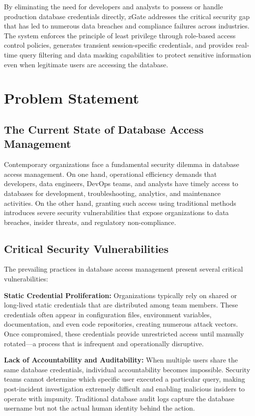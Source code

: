 By eliminating the need for developers and analysts to possess or handle production database credentials directly, zGate addresses the critical security gap that has led to numerous data breaches and compliance failures across industries. The system enforces the principle of least privilege through role-based access control policies, generates transient session-specific credentials, and provides real-time query filtering and data masking capabilities to protect sensitive information even when legitimate users are accessing the database.

\section{Problem Statement}

\subsection{The Current State of Database Access Management}
Contemporary organizations face a fundamental security dilemma in database access management. On one hand, operational efficiency demands that developers, data engineers, DevOps teams, and analysts have timely access to databases for development, troubleshooting, analytics, and maintenance activities. On the other hand, granting such access using traditional methods introduces severe security vulnerabilities that expose organizations to data breaches, insider threats, and regulatory non-compliance.

\subsection{Critical Security Vulnerabilities}
The prevailing practices in database access management present several critical vulnerabilities:

\textbf{Static Credential Proliferation:} Organizations typically rely on shared or long-lived static credentials that are distributed among team members. These credentials often appear in configuration files, environment variables, documentation, and even code repositories, creating numerous attack vectors. Once compromised, these credentials provide unrestricted access until manually rotated—a process that is infrequent and operationally disruptive.

\textbf{Lack of Accountability and Auditability:} When multiple users share the same database credentials, individual accountability becomes impossible. Security teams cannot determine which specific user executed a particular query, making post-incident investigation extremely difficult and enabling malicious insiders to operate with impunity. Traditional database audit logs capture the database username but not the actual human identity behind the action.

